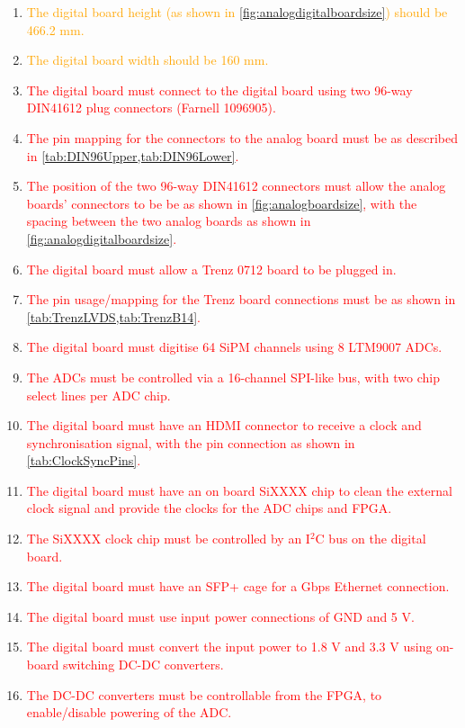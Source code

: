 \documentclass[a4paper]{article}
\newcommand{\must}[1]{\textcolor{red}{#1}}
\newcommand{\should}[1]{\textcolor{orange}{#1}}
\def\I2C{I$^2$C}
\begin{document}
\begin{enumerate}
    \item \should{The digital board height (as shown in \cref{fig:analogdigitalboardsize}) should be 466.2 mm.}
    \item \should{The digital board width should be 160 mm.}
    \item \must{The digital board must connect to the digital board using two 96-way DIN41612 plug connectors (Farnell 1096905).}
    \item \must{The pin mapping for the connectors to the analog board must be as described in \cref{tab:DIN96Upper,tab:DIN96Lower}.}
    \item \must{The position of the two 96-way DIN41612 connectors must allow the analog boards' connectors to be be as shown in \cref{fig:analogboardsize}, with the spacing between the two analog boards as shown in \cref{fig:analogdigitalboardsize}.}
    \item \must{The digital board must allow a Trenz 0712 board to be plugged in.}
    \item \must{The pin usage/mapping for the Trenz board connections must be as shown in \cref{tab:TrenzLVDS,tab:TrenzB14}.}
    \item \must{The digital board must digitise 64 SiPM channels using 8 LTM9007 ADCs.}
    \item \must{The ADCs must be controlled via a 16-channel SPI-like bus, with two chip select lines per ADC chip.}
    \item \must{The digital board must have an HDMI connector to receive a clock and synchronisation signal, with the pin connection as shown in \cref{tab:ClockSyncPins}.}
    \item \must{The digital board must have an on board SiXXXX chip to clean the external clock signal and provide the clocks for the ADC chips and FPGA.}
    \item \must{The SiXXXX clock chip must be controlled by an \I2C bus on the digital board.}
    \item \must{The digital board must have an SFP+ cage for a Gbps Ethernet connection.}
    \item \must{The digital board must use input power connections of GND and 5 V.}
    \item \must{The digital board must convert the input power to 1.8 V and 3.3 V using on-board switching DC-DC converters.}
    \item \must{The DC-DC converters must be controllable from the FPGA, to enable/disable powering of the ADC.}

\end{enumerate}
\end{document}

